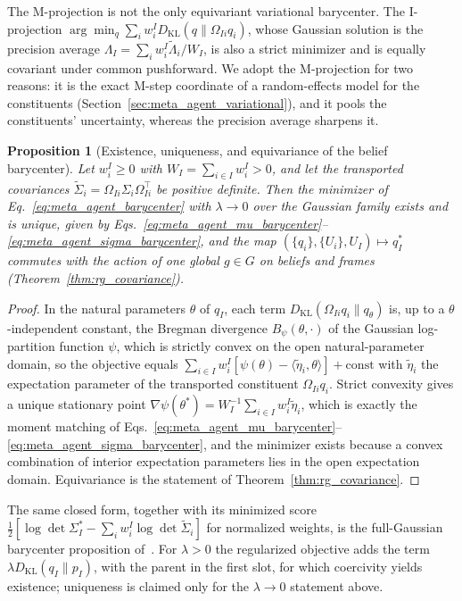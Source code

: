 \documentclass[11pt]{article}
\newtheorem{proposition}{Proposition}
\begin{document}
The M-projection is not the only equivariant variational barycenter. The I-projection $\arg\min_q \sum_i w_i^I D_{\mathrm{KL}}(q \| \Omega_{Ii} q_i)$, whose Gaussian solution is the precision average $\Lambda_I = \sum_i w_i^I \tilde{\Lambda}_i / W_I$, is also a strict minimizer and is equally covariant under common pushforward. We adopt the M-projection for two reasons: it is the exact M-step coordinate of a random-effects model for the constituents (Section~\ref{sec:meta_agent_variational}), and it pools the constituents' uncertainty, whereas the precision average sharpens it.

\begin{proposition}[Existence, uniqueness, and equivariance of the belief barycenter]
\label{prop:barycenter_existence}
Let $w_i^I \ge 0$ with $W_I = \sum_{i \in I} w_i^I > 0$, and let the transported covariances $\tilde{\Sigma}_i = \Omega_{Ii}\Sigma_i\Omega_{Ii}^\top$ be positive definite. Then the minimizer of Eq.~\eqref{eq:meta_agent_barycenter} with $\lambda \to 0$ over the Gaussian family exists and is unique, given by Eqs.~\eqref{eq:meta_agent_mu_barycenter}--\eqref{eq:meta_agent_sigma_barycenter}, and the map $(\{q_i\}, \{U_i\}, U_I) \mapsto q_I^*$ commutes with the action of one global $g \in G$ on beliefs and frames (Theorem~\ref{thm:rg_covariance}).
\end{proposition}

\begin{proof}
In the natural parameters $\theta$ of $q_I$, each term $D_{\mathrm{KL}}(\Omega_{Ii}q_i \| q_\theta)$ is, up to a $\theta$-independent constant, the Bregman divergence $B_\psi(\theta, \cdot)$ of the Gaussian log-partition function $\psi$, which is strictly convex on the open natural-parameter domain, so the objective equals $\sum_{i \in I} w_i^I[\psi(\theta) - \langle \tilde{\eta}_i, \theta\rangle] + \mathrm{const}$ with $\tilde{\eta}_i$ the expectation parameter of the transported constituent $\Omega_{Ii}q_i$. Strict convexity gives a unique stationary point $\nabla\psi(\theta^*) = W_I^{-1}\sum_{i \in I} w_i^I \tilde{\eta}_i$, which is exactly the moment matching of Eqs.~\eqref{eq:meta_agent_mu_barycenter}--\eqref{eq:meta_agent_sigma_barycenter}, and the minimizer exists because a convex combination of interior expectation parameters lies in the open expectation domain. Equivariance is the statement of Theorem~\ref{thm:rg_covariance}.
\end{proof}

The same closed form, together with its minimized score $\tfrac12[\log\det\Sigma_I^* - \sum_i w_i^I \log\det\tilde{\Sigma}_i]$ for normalized weights, is the full-Gaussian barycenter proposition of~\cite[Ch.~G8]{DennisGaugeVFESuppG2026}. For $\lambda > 0$ the regularized objective adds the term $\lambda D_{\mathrm{KL}}(q_I \| p_I)$, with the parent in the first slot, for which coercivity yields existence; uniqueness is claimed only for the $\lambda \to 0$ statement above.
\end{document}
